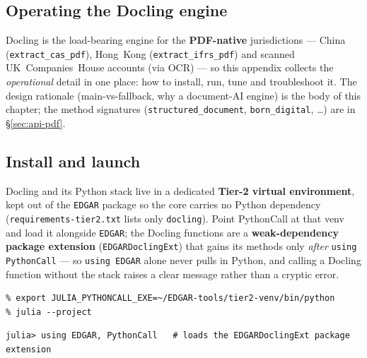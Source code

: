 \documentclass[11pt,a4paper]{report}
\begin{document}
\begin{subappendices}
\section{Operating the Docling engine}
\label{app:docling}

Docling is the load-bearing engine for the \textbf{PDF-native} jurisdictions --- China
(\texttt{extract\_cas\_pdf}), Hong~Kong (\texttt{extract\_ifrs\_pdf}) and scanned UK~Companies~House accounts
(via OCR) --- so this appendix collects the \emph{operational} detail in one place: how to install, run, tune
and troubleshoot it. The design rationale (main-vs-fallback, why a document-AI engine) is the body of this
chapter; the method signatures (\texttt{structured\_document}, \texttt{born\_digital}, \ldots) are in
\S\ref{sec:api-pdf}.

\subsection{Install and launch}
Docling and its Python stack live in a dedicated \textbf{Tier-2 virtual environment}, kept out of the
\texttt{EDGAR} package so the core carries no Python dependency (\texttt{requirements-tier2.txt} lists only
\texttt{docling}). Point PythonCall at that venv and load it alongside \texttt{EDGAR}; the Docling functions
are a \textbf{weak-dependency package extension} (\texttt{EDGARDoclingExt}) that gains its methods only
\emph{after} \texttt{using PythonCall} --- so \texttt{using EDGAR} alone never pulls in Python, and calling a
Docling function without the stack raises a clear message rather than a cryptic error.

\begin{lstlisting}[style=term]
% export JULIA_CONDAPKG_BACKEND=Null                       # don't let CondaPkg manage Python
% export JULIA_PYTHONCALL_EXE=~/EDGAR-tools/tier2-venv/bin/python
% julia --project
\end{lstlisting}
\begin{lstlisting}
julia> using EDGAR, PythonCall   # loads the EDGARDoclingExt package extension
\end{lstlisting}


\end{subappendices}
\end{document}
